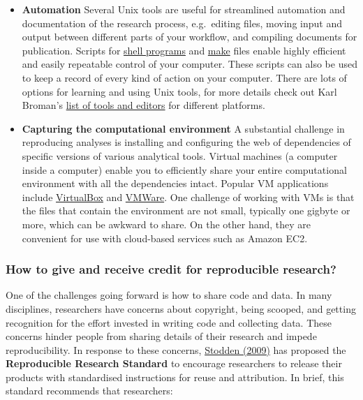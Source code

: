 \documentclass[
]{book}
\begin{document}
\begin{itemize}
\item
  \textbf{Automation} Several Unix tools are useful for streamlined automation and documentation of the research process, e.g.~editing files, moving input and output between different parts of your workflow, and compiling documents for publication. Scripts for \href{http://www.gnu.org/software/bash/}{shell programs} and \href{http://www.gnu.org/software/make/}{make} files enable highly efficient and easily repeatable control of your computer. These scripts can also be used to keep a record of every kind of action on your computer. There are lots of options for learning and using Unix tools, for more details check out Karl Broman's \href{http://kbroman.github.io/Tools4RR/assets/lectures/02_unix_withnotes.pdf}{list of tools and editors} for different platforms.
\item
  \textbf{Capturing the computational environment} A substantial challenge in reproducing analyses is installing and configuring the web of dependencies of specific versions of various analytical tools. Virtual machines (a computer inside a computer) enable you to efficiently share your entire computational environment with all the dependencies intact. Popular VM applications include \href{https://www.virtualbox.org/}{VirtualBox} and \href{http://www.vmware.com/}{VMWare}. One challenge of working with VMs is that the files that contain the environment are not small, typically one gigbyte or more, which can be awkward to share. On the other hand, they are convenient for use with cloud-based services such as Amazon EC2.
\end{itemize}

\hypertarget{how-to-give-and-receive-credit-for-reproducible-research}{%
\subsubsection{How to give and receive credit for reproducible research?}\label{how-to-give-and-receive-credit-for-reproducible-research}}

One of the challenges going forward is how to share code and data. In many disciplines, researchers have concerns about copyright, being scooped, and getting recognition for the effort invested in writing code and collecting data. These concerns hinder people from sharing details of their research and impede reproducibility. In response to these concerns, \href{http://papers.ssrn.com/sol3/papers.cfm?abstract_id=1362040}{Stodden (2009)} has proposed the \textbf{Reproducible Research Standard} to encourage researchers to release their products with standardised instructions for reuse and attribution. In brief, this standard recommends that researchers:
\end{document}
